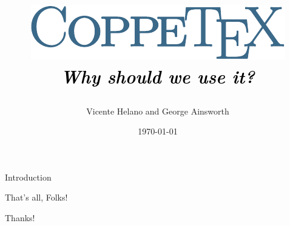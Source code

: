 \documentclass[style=coppe,mode=present,paper=a4paper]{powerdot}
\title{%
\begin{center}
\includegraphics[scale=0.5]{images/logo}\\
\textcolor{black}{\normalsize \fontfamily{cmr}\emph{Why should we use it?}}
\end{center}}
\author{Vicente Helano and George Ainsworth}
\date{\today}
\begin{document}
\maketitle

\begin{slide}{Introduction}
\vspace*{1cm}

\end{slide}

\begin{slide}{That's all, Folks!}
\vspace*{\fill}
\begin{center}
\Huge Thanks!
\end{center}
\vspace*{\fill}
\end{slide}
\end{document}
